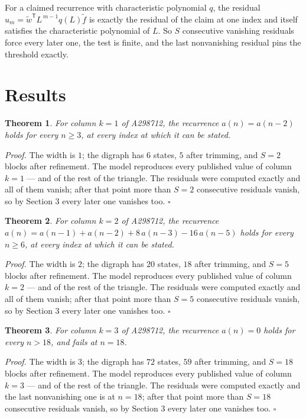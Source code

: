 \documentclass[11pt]{article}
\newtheorem{theorem}{Theorem}
\theoremstyle{definition}
\begin{document}
For a claimed recurrence with characteristic polynomial $q$, the residual $u_m = \tilde w^{\mathsf T}L^{\,m-1}q(L)\tilde f$ is exactly the residual of the claim at one index and itself satisfies the characteristic polynomial of $L$. So $S$ consecutive vanishing residuals force every later one, the test is finite, and the last nonvanishing residual pins the threshold exactly.

\section{Results}

\begin{theorem} For column $k = 1$ of A298712, the recurrence $a(n) = a(n-2)$ holds for every $n \ge 3$, at every index at which it can be stated.\end{theorem}

{\itshape Proof.} The width is $1$; the digraph has $6$ states, $5$ after trimming, and $S = 2$ blocks after refinement. The model reproduces every published value of column $k = 1$ --- and of the rest of the triangle. The residuals were computed exactly and all of them vanish; after that point more than $S = 2$ consecutive residuals vanish, so by Section 3 every later one vanishes too. $\square$

\begin{theorem} For column $k = 2$ of A298712, the recurrence $a(n) = a(n-1) + a(n-2) + 8\,a(n-3) - 16\,a(n-5)$ holds for every $n \ge 6$, at every index at which it can be stated.\end{theorem}

{\itshape Proof.} The width is $2$; the digraph has $20$ states, $18$ after trimming, and $S = 5$ blocks after refinement. The model reproduces every published value of column $k = 2$ --- and of the rest of the triangle. The residuals were computed exactly and all of them vanish; after that point more than $S = 5$ consecutive residuals vanish, so by Section 3 every later one vanishes too. $\square$

\begin{theorem} For column $k = 3$ of A298712, the recurrence $a(n) = 0$ holds for every $n > 18$, and fails at $n = 18$.\end{theorem}

{\itshape Proof.} The width is $3$; the digraph has $72$ states, $59$ after trimming, and $S = 18$ blocks after refinement. The model reproduces every published value of column $k = 3$ --- and of the rest of the triangle. The residuals were computed exactly and the last nonvanishing one is at $n = 18$; after that point more than $S = 18$ consecutive residuals vanish, so by Section 3 every later one vanishes too. $\square$
\end{document}
